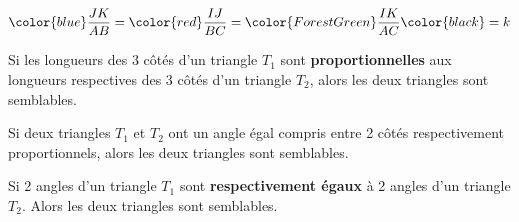 \[ 	{\color{blue} \frac{JK}{AB} } = {\color{red} \frac{IJ}{BC} } = {\color{ForestGreen} \frac{IK}{AC} } \color{black} =k \]
\begin{postulat} Si les longueurs des 3 côtés d'un triangle $T_1$ sont \textbf{proportionnelles} aux longueurs respectives des 3 côtés d'un triangle $T_2$, alors les deux triangles sont semblables.
\end{postulat}

\begin{postulat} Si deux triangles $T_1$ et $T_2$ ont un angle égal compris entre 2 côtés respectivement proportionnels, alors les deux triangles sont semblables.  
\end{postulat} 
 
\begin{postulat} Si 2 angles d'un triangle $T_1$ sont \textbf{respectivement égaux} à 2 angles d'un triangle $T_2$. Alors les deux triangles sont semblables.  
\end{postulat} 
